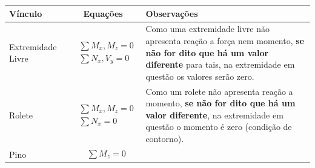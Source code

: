 \documentclass{article}
\begin{document}
\begin{table}[h]
    \centering
    \begin{tabular}{|l|c|l|}\hline
        \textbf{Vínculo}               & \textbf{Equações} & \textbf{Observações}                                                                                                          \\ \hline
        Extremidade Livre              &
        \begin{minipage}{.4\textwidth}
            {\begin{align*}
                     & \sum M_x, M_z = 0 \\
                     & \sum N_x, V_y = 0
                \end{align*}}
        \end{minipage} &

        \begin{minipage}{.4\textwidth}
            \vspace{5px}
            Como uma extremidade livre não apresenta reação a força nem momento, \textbf{se não for dito que há um valor diferente} para tais, na extremidade em questão os valores serão zero.
        \end{minipage} \\ \hline

        Rolete                         &
        \begin{minipage}{.4\textwidth}
            {\begin{align*}
                     & \sum M_x, M_z = 0 \\
                     & \sum N_x = 0
                \end{align*}}
        \end{minipage} &

        \begin{minipage}{.4\textwidth}
            \vspace{5px}
            Como um rolete não apresenta reação a momento, \textbf{se não for dito que há um valor diferente}, na extremidade em questão  o momento é zero (condição de contorno).
        \end{minipage}              \\ \hline

        Pino                           &
        \begin{minipage}{.4\textwidth}
            {\begin{align*}
                     & \sum M_z = 0
                \end{align*}}
        \end{minipage} &


\end{tabular}
\end{table}
\end{document}
